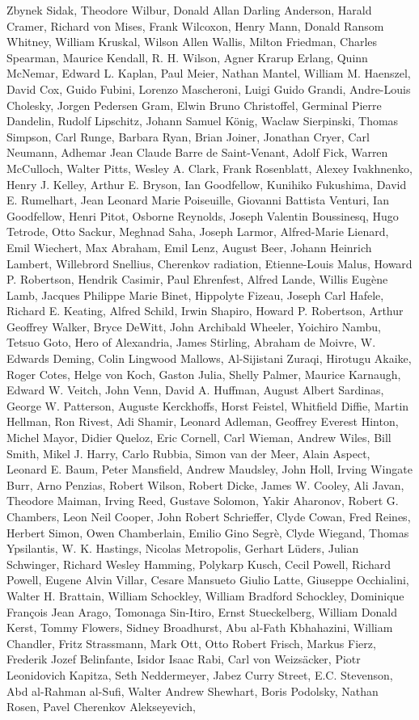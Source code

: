 \begin{spacing}{0.5}
\begin{tiny}
Zbynek Sidak, Theodore Wilbur, Donald Allan Darling Anderson, Harald Cramer, Richard von Mises, Frank Wilcoxon, Henry Mann, Donald Ransom Whitney, William Kruskal, Wilson Allen Wallis, Milton Friedman, Charles Spearman, Maurice Kendall, R. H. Wilson, Agner Krarup Erlang, Quinn McNemar, Edward L. Kaplan, Paul Meier, Nathan Mantel, William M. Haenszel, David Cox, Guido Fubini, Lorenzo Mascheroni, Luigi Guido Grandi, Andre-Louis Cholesky, Jorgen Pedersen Gram, Elwin Bruno Christoffel, Germinal Pierre Dandelin, Rudolf Lipschitz, Johann Samuel König, Waclaw Sierpinski, Thomas Simpson, Carl Runge, Barbara Ryan, Brian Joiner, Jonathan Cryer, Carl Neumann, Adhemar Jean Claude Barre de Saint-Venant, Adolf Fick, Warren McCulloch, Walter Pitts, Wesley A. Clark, Frank Rosenblatt, Alexey Ivakhnenko, Henry J. Kelley, Arthur E. Bryson, Ian Goodfellow, Kunihiko Fukushima, David E. Rumelhart, Jean Leonard Marie Poiseuille, Giovanni Battista Venturi, Ian Goodfellow, Henri Pitot, Osborne Reynolds, Joseph Valentin Boussinesq, Hugo Tetrode, Otto Sackur, Meghnad Saha, Joseph Larmor, Alfred-Marie Lienard, Emil Wiechert, Max Abraham, Emil Lenz, August Beer, Johann Heinrich Lambert, Willebrord Snellius, Cherenkov radiation, Etienne-Louis Malus, Howard P. Robertson, Hendrik Casimir, Paul Ehrenfest, Alfred Lande, Willis Eugène Lamb, Jacques Philippe Marie Binet, Hippolyte Fizeau, Joseph Carl Hafele, Richard E. Keating, Alfred Schild, Irwin Shapiro, Howard P. Robertson, Arthur Geoffrey Walker, Bryce DeWitt, John Archibald Wheeler, Yoichiro Nambu, Tetsuo Goto, Hero of Alexandria, James Stirling, Abraham de Moivre, W. Edwards Deming, Colin Lingwood Mallows, Al-Sijistani Zuraqi, Hirotugu Akaike, Roger Cotes, Helge von Koch, Gaston Julia, Shelly Palmer, Maurice Karnaugh, Edward W. Veitch, John Venn, David A. Huffman, August Albert Sardinas, George W. Patterson, Auguste Kerckhoffs, Horst Feistel, Whitfield Diffie, Martin Hellman, Ron Rivest, Adi Shamir, Leonard Adleman, Geoffrey Everest Hinton, Michel Mayor, Didier Queloz, Eric Cornell, Carl Wieman, Andrew Wiles, Bill Smith, Mikel J. Harry, Carlo Rubbia, Simon van der Meer, Alain Aspect, Leonard E. Baum, Peter Mansfield, Andrew Maudsley, John Holl, Irving Wingate Burr, Arno Penzias, Robert Wilson, Robert Dicke, James W. Cooley, Ali Javan, Theodore Maiman, Irving Reed, Gustave Solomon, Yakir Aharonov, Robert G. Chambers, Leon Neil Cooper, John Robert Schrieffer, Clyde Cowan, Fred Reines, Herbert Simon,  Owen Chamberlain, Emilio Gino Segrè, Clyde Wiegand,  Thomas Ypsilantis, W. K. Hastings, Nicolas Metropolis, Gerhart Lüders, Julian Schwinger, Richard Wesley Hamming, Polykarp Kusch, Cecil Powell, Richard Powell, Eugene Alvin Villar, Cesare Mansueto Giulio Latte, Giuseppe Occhialini, Walter H. Brattain, William Schockley, William Bradford Schockley, Dominique François Jean Arago, Tomonaga Sin-Itiro, Ernst Stueckelberg, William Donald Kerst, Tommy Flowers, Sidney Broadhurst, Abu al-Fath Kbhahazini, William Chandler, Fritz Strassmann, Mark Ott, Otto Robert Frisch, Markus Fierz, Frederik Jozef Belinfante, Isidor Isaac Rabi, Carl von Weizsäcker, Piotr Leonidovich Kapitza, Seth Neddermeyer, Jabez Curry Street, E.C. Stevenson, Abd al-Rahman al-Sufi, Walter Andrew Shewhart, Boris Podolsky, Nathan Rosen, Pavel Cherenkov Alekseyevich, 
\end{tiny}
\end{spacing}
